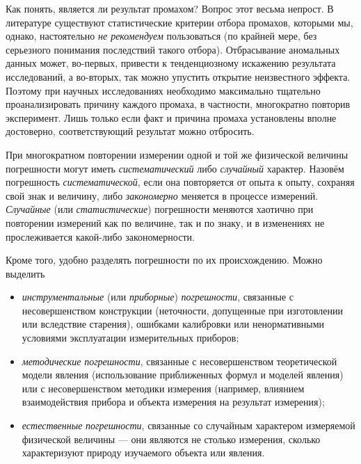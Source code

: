 Как понять, является ли  результат промахом? Вопрос этот весьма
непрост. В литературе существуют статистические
критерии отбора промахов, которыми мы, однако, настоятельно \emph{не рекомендуем}
пользоваться (по крайней мере, без серьезного понимания последствий
такого отбора). Отбрасывание аномальных данных может, во-первых, привести
к тенденциозному искажению результата исследований, а во-вторых, так
можно упустить открытие неизвестного эффекта. Поэтому при научных
исследованиях необходимо максимально тщательно проанализировать причину
каждого промаха, в частности, многократно повторив эксперимент. Лишь
только если факт и причина промаха установлены вполне достоверно,
соответствующий результат можно отбросить.


При многократном повторении измерении одной и той же физической величины
погрешности могут иметь \emph{систематический} либо \emph{случайный}
характер. Назовём погрешность \emph{систематической}, если она повторяется
от опыта к опыту, сохраняя свой знак и величину, либо \emph{закономерно}
меняется в процессе измерений. \emph{Случайные} (или \emph{статистические})
погрешности меняются хаотично при повторении измерений как по величине,
так и по знаку, и в изменениях не прослеживается какой-либо закономерности.

Кроме того, удобно разделять погрешности по их происхождению. Можно
выделить
\begin{itemize}
    \item \emph{инструментальные} (или \emph{приборные}) \emph{погрешности},
связанные с несовершенством конструкции (неточности, допущенные при
изготовлении или вследствие старения), ошибками калибровки или ненормативными
условиями эксплуатации измерительных приборов;
    \item \emph{методические} \emph{погрешности}, связанные с несовершенством
теоретической модели явления (использование приближенных формул и
моделей явления) или с несовершенством методики измерения (например,
влиянием взаимодействия прибора и объекта измерения на результат измерения);
    \item \emph{естественные} \emph{погрешности}, связанные со случайным
характером
измеряемой физической величины --- они являются не столько
 измерения, сколько характеризуют
природу изучаемого объекта или явления.
\end{itemize}

